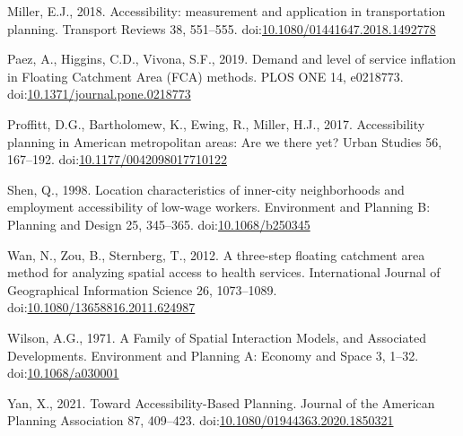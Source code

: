 \documentclass[]{elsarticle} %
\newlength{\cslhangindent}
\newenvironment{CSLReferences}[2] %
 {%
  \setlength{\parindent}{0pt}
  \ifodd #1 \everypar{\setlength{\hangindent}{\cslhangindent}}\ignorespaces\fi
  \ifnum #2 > 0
  \setlength{\parskip}{#2\baselineskip}
  \fi
 }%
 {}
\begin{document}
\begin{CSLReferences}{1}{0}
\leavevmode{}%
Miller, E.J., 2018. Accessibility: measurement and application in
transportation planning. Transport Reviews 38, 551--555.
doi:\href{https://doi.org/10.1080/01441647.2018.1492778}{10.1080/01441647.2018.1492778}

\leavevmode{}%
Paez, A., Higgins, C.D., Vivona, S.F., 2019. Demand and level of service
inflation in Floating Catchment Area (FCA) methods. PLOS ONE 14,
e0218773.
doi:\href{https://doi.org/10.1371/journal.pone.0218773}{10.1371/journal.pone.0218773}

\leavevmode{}%
Proffitt, D.G., Bartholomew, K., Ewing, R., Miller, H.J., 2017.
Accessibility planning in American metropolitan areas: Are we there yet?
Urban Studies 56, 167--192.
doi:\href{https://doi.org/10.1177/0042098017710122}{10.1177/0042098017710122}

\leavevmode{}%
Shen, Q., 1998. Location characteristics of inner-city neighborhoods and
employment accessibility of low-wage workers. Environment and Planning
B: Planning and Design 25, 345--365.
doi:\href{https://doi.org/10.1068/b250345}{10.1068/b250345}

\leavevmode{}%
Wan, N., Zou, B., Sternberg, T., 2012. A three-step floating catchment
area method for analyzing spatial access to health services.
International Journal of Geographical Information Science 26,
1073--1089.
doi:\href{https://doi.org/10.1080/13658816.2011.624987}{10.1080/13658816.2011.624987}

\leavevmode{}%
Wilson, A.G., 1971. A Family of Spatial Interaction Models, and
Associated Developments. Environment and Planning A: Economy and Space
3, 1--32. doi:\href{https://doi.org/10.1068/a030001}{10.1068/a030001}

\leavevmode{}%
Yan, X., 2021. Toward Accessibility-Based Planning. Journal of the
American Planning Association 87, 409--423.
doi:\href{https://doi.org/10.1080/01944363.2020.1850321}{10.1080/01944363.2020.1850321}

\end{CSLReferences}
\end{document}
